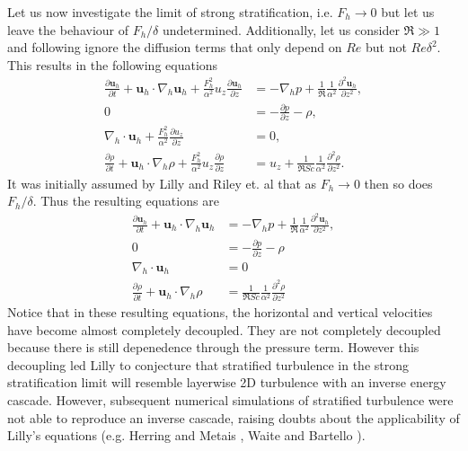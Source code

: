 Let us now investigate the limit of strong stratification, i.e. $F_{h}\rightarrow 0$ but let us leave the behaviour of $F_{h}/\delta$ undetermined. Additionally, let us consider $\Re\gg 1$ and following \cite{rileylindborg2013} ignore the diffusion terms that only depend on $Re$ but not $Re\delta^{2}$.  This results in the following equations 
\begin{align}
\frac{\partial \textbf{u}_{h}}{\partial t} + \textbf{u}_{h}\cdot\nabla_{h}\textbf{u}_{h}+\frac{F_{h}^{2}}{\alpha^{2}}u_{z}\frac{\partial \textbf{u}_{h}}{\partial z} &= -\nabla_{h}p + \frac{1}{\Re}\frac{1}{\alpha^{2}}\frac{\partial^{2}\textbf{u}_{h}}{\partial z^{2}},\\
0&= -\frac{\partial p}{\partial z} - \rho, \\
\nabla_{h}\cdot\textbf{u}_{h}+ \frac{F_{h}^{2}}{\alpha^{2}}\frac{\partial u_{z}}{\partial z} &=0,\\
\frac{\partial \rho}{\partial t} + \textbf{u}_{h}\cdot\nabla_{h}\rho + \frac{F_{h}^{2}}{\alpha^{2}}u_{z}\frac{\partial \rho}{\partial z} &= u_{z} + \frac{1}{\Re Sc}\frac{1}{\alpha^{2}}\frac{\partial^{2}\rho}{\partial z^{2}} .
\end{align} 
It was initially assumed by Lilly \cite{lilly1983} and Riley et. al \cite{rileylelong2000} that as $F_{h}\rightarrow 0$ then so does $F_{h}/\delta$. Thus the resulting equations are 
\begin{align}
\frac{\partial \textbf{u}_{h}}{\partial t} + \textbf{u}_{h}\cdot\nabla_{h}\textbf{u}_{h} &= -\nabla_{h}p + \frac{1}{\Re}\frac{1}{\alpha^{2}}\frac{\partial^{2}\textbf{u}_{h}}{\partial z^{2}},\\
0&= -\frac{\partial p}{\partial z} - \rho  \\
\nabla_{h}\cdot\textbf{u}_{h} &=0\\
\frac{\partial \rho}{\partial t} + \textbf{u}_{h}\cdot\nabla_{h}\rho &= \frac{1}{\Re Sc}\frac{1}{\alpha^{2}}\frac{\partial^{2}\rho}{\partial z^{2}} 
\end{align} 
Notice that in these resulting equations, the horizontal and vertical velocities have become almost completely decoupled. They are not completely decoupled because there is still depenedence through the pressure term. However this decoupling led Lilly to conjecture that stratified turbulence in the strong stratification limit will resemble layerwise 2D turbulence with an inverse energy cascade\cite{lilly1983}. However, subsequent numerical simulations of stratified turbulence were not able to reproduce an inverse cascade, raising doubts about the applicability of Lilly's equations (e.g. Herring and Metais \cite{metais1989}, Waite and Bartello \cite{waitebartello2004}).


